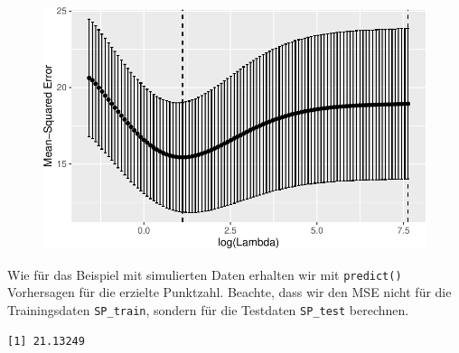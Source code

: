 \documentclass[
  a4paper,
  DIV=11,
  oneside]{scrreprt}
\newenvironment{Shaded}{\begin{snugshade}}{\end{snugshade}}
\newcommand{\AttributeTok}[1]{\textcolor[rgb]{0.40,0.45,0.13}{#1}}
\newcommand{\CommentTok}[1]{\textcolor[rgb]{0.37,0.37,0.37}{#1}}
\newcommand{\DecValTok}[1]{\textcolor[rgb]{0.68,0.00,0.00}{#1}}
\newcommand{\FunctionTok}[1]{\textcolor[rgb]{0.28,0.35,0.67}{#1}}
\newcommand{\NormalTok}[1]{\textcolor[rgb]{0.00,0.23,0.31}{#1}}
\newcommand{\OtherTok}[1]{\textcolor[rgb]{0.00,0.23,0.31}{#1}}
\newcommand{\SpecialCharTok}[1]{\textcolor[rgb]{0.37,0.37,0.37}{#1}}
\begin{document}
\begin{figure}[t]

{\centering \includegraphics{RegReg_files/figure-pdf/unnamed-chunk-16-1.pdf}

}

\end{figure}

Wie für das Beispiel mit simulierten Daten erhalten wir mit
\texttt{predict()} Vorhersagen für die erzielte Punktzahl. Beachte, dass
wir den MSE nicht für die Trainingsdaten \texttt{SP\_train}, sondern für
die Testdaten \texttt{SP\_test} berechnen.

\begin{Shaded}
\end{Shaded}

\begin{verbatim}
[1] 21.13249
\end{verbatim}
\end{document}
